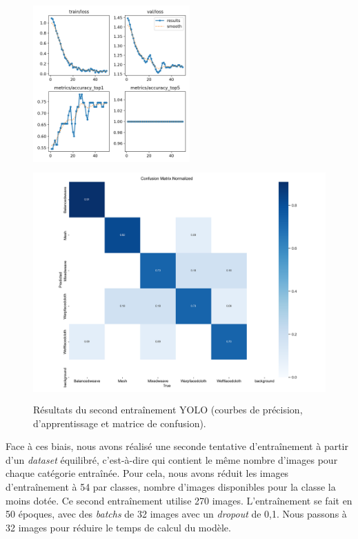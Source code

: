 \begin{figure}[!h]
    \begin{minipage}[c]{.4\linewidth}
            \begin{center}
                \includegraphics[height=6cm]{../images/YOLO_50epoch_eq.png}
            \end{center}
    \end{minipage}
        \begin{minipage}[c]{.6\linewidth}
        \begin{center}
        		\includegraphics[height=9cm]{../images/YOLO_50epoch_eq_confusion_matrix_normalized.png}
	\end{center}
    \end{minipage}
    \caption{Résultats du second entraînement YOLO (courbes de précision, d'apprentissage et matrice de confusion).}
    \label{fig:YOLO_eq}   
\end{figure}

Face à ces biais, nous avons réalisé une seconde tentative d'entraînement à partir d'un \textit{dataset} équilibré, c'est-à-dire qui contient le même nombre d'images pour chaque catégorie entraînée. Pour cela, nous avons réduit les images d'entraînement à 54 par classes, nombre d'images disponibles pour la classe la moins dotée. Ce second entraînement utilise 270 images. L'entraînement se fait en 50 époques, avec des \textit{batchs} de 32 images avec un \textit{dropout} de 0,1. Nous passons à 32 images pour réduire le temps de calcul du modèle.

